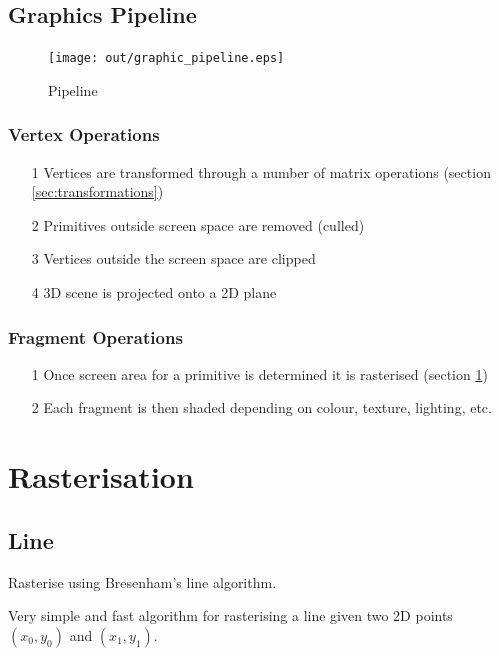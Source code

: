 \documentclass[a4paper]{article}
\begin{document}
\subsection{Graphics Pipeline}

\begin{figure}[h!]
  \centering
  \texttt{[image: out/graphic\_pipeline.eps]}
  \caption{Pipeline}
  \label{fig:graphics_pipeline}
\end{figure}
\FloatBarrier

\subsubsection{Vertex Operations}

\begin{enumerate}
  \item[1] Vertices are transformed through a number of matrix operations
           (section \ref{sec:transformations})
  \item[2] Primitives outside screen space are removed (culled)
  \item[3] Vertices outside the screen space are clipped
  \item[4] 3D scene is projected onto a 2D plane
\end{enumerate}

\subsubsection{Fragment Operations}

\begin{enumerate}
  \item[1] Once screen area for a primitive is determined it is rasterised
           (section \ref{sec:rasterisation})
  \item[2] Each fragment is then shaded depending on colour, texture, lighting,
           etc.
\end{enumerate}

\section{Rasterisation}
\label{sec:rasterisation}

\subsection{Line}

Rasterise using Bresenham's line algorithm.

Very simple and fast algorithm for rasterising a line given two 2D points
$(x_{0}, y_{0})$ and $(x_{1}, y_{1})$.
\end{document}
